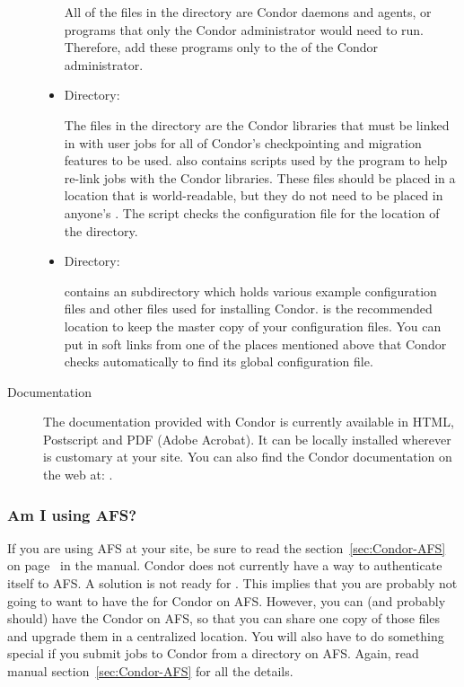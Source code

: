 \begin{description}
\begin{itemize}
     All of the files in the  directory are Condor daemons and
     agents, or programs that only the Condor administrator would need
     to run.  Therefore, add these programs only
     to the  of the Condor administrator.

     \item {} Directory:

     The files in the  directory are the Condor libraries that
     must be linked in with user jobs for all of Condor's
     checkpointing and migration features to be used.   also
     contains scripts used by the  program to help
     re-link jobs with the Condor libraries.  These files should be
     placed in a location that is world-readable, but they do not need
     to be placed in anyone's .  The  script checks
     the configuration file for the location of the  directory.

     \item {} Directory:

      contains an  subdirectory which holds various
     example configuration files and other files used for installing Condor.
      is the recommended location to keep the master copy of your
     configuration files.  You can put in soft links from one of the places
     mentioned above that Condor checks automatically to find its
     global configuration file. 
\end{itemize}

\item[Documentation]

The documentation provided with Condor is currently available in
     HTML, Postscript and PDF (Adobe Acrobat).  It can be locally installed
     wherever is customary at your site.  You can also find the Condor
     documentation on the web at:
     .

\end{description}

\subsubsection{Am I using AFS?}

If you are using AFS at your site, be sure to read the
section~\ref{sec:Condor-AFS} on page~\pageref{sec:Condor-AFS} in the
manual.
Condor does not currently have a way to authenticate itself to AFS.
A solution is not ready for
\VersionNotice.
This implies that you are probably not going to want
to have the  for Condor on AFS.
However, you can
(and probably should) have the Condor  on AFS, so
that you can share one copy of those files and upgrade them in a
centralized location.  You will also have to do something special if
you submit jobs to Condor from a directory on AFS.  Again, read manual
section~\ref{sec:Condor-AFS} for all the details.

